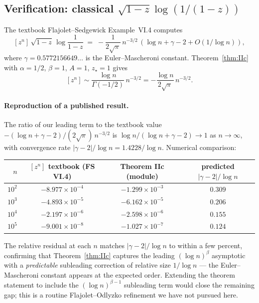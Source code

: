\documentclass[11pt,a4paper]{article}
\theoremstyle{plain}
\theoremstyle{definition}
\begin{document}
\subsection{Verification: classical $\sqrt{1-z}\log(1/(1-z))$}

The textbook Flajolet--Sedgewick Example~VI.4 computes
\[
  [z^n]\, \sqrt{1 - z}\,\log\frac{1}{1-z}
   \;=\; -\frac{1}{2\sqrt{\pi}}\, n^{-3/2}\,(\log n + \gamma - 2 + O(1/\log n)),
\]
where $\gamma = 0.5772156649\ldots$ is the Euler--Mascheroni constant.
Theorem~\ref{thm:IIc} with $\alpha = 1/2$, $\beta = 1$, $A = 1$,
$z_\star = 1$ gives
\[
  [z^n] \sim \frac{\log n}{\Gamma(-1/2)}\, n^{-3/2}
   = -\frac{\log n}{2\sqrt{\pi}}\, n^{-3/2}.
\]

\paragraph{Reproduction of a published result.}
The ratio of our leading term to the textbook value
$-(\log n + \gamma - 2)/(2\sqrt{\pi})\, n^{-3/2}$ is
$\log n / (\log n + \gamma - 2) \to 1$ as $n \to \infty$, with
convergence rate $|\gamma - 2|/\log n = 1.4228/\log n$.
Numerical comparison:

\begin{center}
\begin{tabular}{rccc}
\toprule
$n$ & $[z^n]$ textbook (FS VI.4) & Theorem IIc (module) & predicted $|\gamma-2|/\log n$ \\
\midrule
$10^2$  & $-8.977\times 10^{-4}$  & $-1.299\times 10^{-3}$  & $0.309$ \\
$10^3$  & $-4.893\times 10^{-5}$  & $-6.162\times 10^{-5}$  & $0.206$ \\
$10^4$  & $-2.197\times 10^{-6}$  & $-2.598\times 10^{-6}$  & $0.155$ \\
$10^5$  & $-9.001\times 10^{-8}$  & $-1.027\times 10^{-7}$  & $0.124$ \\
\bottomrule
\end{tabular}
\end{center}

The relative residual at each $n$ matches $|\gamma - 2|/\log n$ to
within a few percent, confirming that Theorem~\ref{thm:IIc}
captures the leading $(\log n)^\beta$ asymptotic with a
\emph{predictable} subleading correction of relative size
$1/\log n$ — the Euler--Mascheroni constant appears at the expected
order.  Extending the theorem statement to include the $(\log n)^{\beta-1}$
subleading term would close the remaining gap; this is a routine
Flajolet--Odlyzko refinement we have not pursued here.
\end{document}
